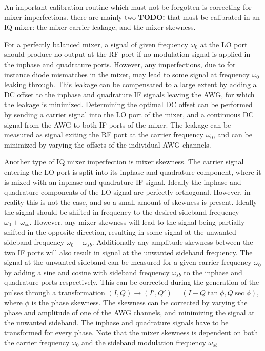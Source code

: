       An important calibration routine which must not be forgotten is correcting for mixer imperfections. there are mainly two \textbf{TODO:} that must be calibrated in an IQ mixer: the mixer carrier leakage, and the mixer skewness.

      For a perfectly balanced mixer, a signal of given frequency $\omega_0$ at the LO port should produce no output at the RF port if no modulation signal is applied in the inphase and quadrature ports.  However, any imperfections, due to for instance diode mismatches in the mixer, may lead to some signal at frequency $\omega_0$ leaking through. This leakage can be compensated to a large extent by adding a DC offset to the inphase and quadrature IF signals leaving the AWG, for which the leakage is minimized. Determining the optimal DC offset can be performed by sending a carrier signal into the LO port of the mixer, and a continuous DC signal from the AWG to both IF ports of the mixer. The leakage can be measured as signal exiting the RF port at the carrier frequency $\omega_0$, and can be minimized by varying the offsets of the individual AWG channels.

      Another type of IQ mixer imperfection is mixer skewness. The carrier signal entering the LO port is split into its inphase and quadrature component, where it is mixed with an inphase and quadrature IF signal. Ideally the inphase and quadrature components of the LO signal are perfectly orthogonal. However, in reality this is not the case, and so a small amount of skewness is present. Ideally the signal should be shifted in frequency to the desired sideband frequency $\omega_0 + \omega_{sb}$. However, any mixer skewness will lead to the signal being partially shifted in the opposite direction, resulting in some signal at the unwanted sideband frequency $\omega_0 - \omega_{sb}$. Additionally any amplitude skewness between the two IF ports will also result in signal at the unwanted sideband frequency. The signal at the unwanted sideband can be measured for a given carrier frequency $\omega_0$ by adding a sine and cosine with sideband frequency $\omega_{sb}$ to the inphase and quadrature ports respectively.   This can be corrected during the generation of the pulses through a transformation $\left( I, Q \right) \rightarrow \left( I', Q' \right) = \left( I - Q \tan{\phi}, Q \sec{\phi} \right)$, where $\phi$ is the phase skewness. The skewness can be corrected by varying the phase and amplitude of one of the AWG channels, and minimizing the signal at the unwanted sideband. The inphase and quadrature signals have to be transformed for every phase. Note that the mixer skewness is dependent on both the carrier frequency $\omega_0$ and the sideband modulation frequency $\omega_{sb}$


